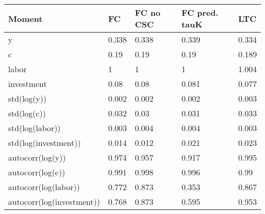 \begin{tabular}{lllll}
Moment & FC & FC no CSC & FC pred. tauK & LTC \\ 
\hline 
y & 0.338 & 0.338 & 0.339 & 0.334 \\ 
c & 0.19 & 0.19 & 0.19 & 0.189 \\ 
labor & 1 & 1 & 1 & 1.004 \\ 
investment & 0.08 & 0.08 & 0.081 & 0.077 \\ 
std(log(y)) & 0.002 & 0.002 & 0.002 & 0.003 \\ 
std(log(c)) & 0.032 & 0.03 & 0.031 & 0.033 \\ 
std(log(labor)) & 0.003 & 0.004 & 0.004 & 0.003 \\ 
std(log(investment)) & 0.014 & 0.012 & 0.021 & 0.023 \\ 
autocorr(log(y)) & 0.974 & 0.957 & 0.917 & 0.995 \\ 
autocorr(log(c)) & 0.991 & 0.998 & 0.996 & 0.99 \\ 
autocorr(log(labor)) & 0.772 & 0.873 & 0.353 & 0.867 \\ 
autocorr(log(investment)) & 0.768 & 0.873 & 0.595 & 0.953 \\ 
\hline 
\end{tabular}